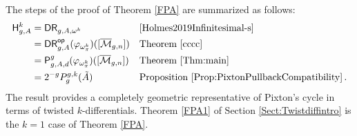 \documentclass[a4paper,12pt]{article} %
\def\P{\mathsf{P}}
\theoremstyle{definition}
\theoremstyle{plain}%
\renewcommand{\phi}{\varphi}
\newcommand{\jocomment}[1]{}
\begin{document}
The steps of the proof of Theorem \ref{FPA} are summarized as follows:
\begin{align*}
    \mathsf{H}^k_{g,A}&=\mathsf{DR}_{g,A, \omega^k} &&\cite[\text{Theorem }1.1]{Holmes2019Infinitesimal-s}\\
    &=\mathsf{DR}^{\mathsf{op}}_{g,A}(\phi_{\omega_\pi^k})([\overline{\mathcal{M}}_{g,n}]) &&\text{Theorem }\ref{cccc}\\
    &=\P_{g,A,d}^g(\phi_{\omega_\pi^k})([\overline{\mathcal{M}}_{g,n}]) &&\text{Theorem }\ref{Thm:main}\\
    &=2^{-g} P_g^{g,k}(\tilde A) &&\text{Proposition }\ref{Prop:PixtonPullbackCompatibility}\, . 
\end{align*}
The result provides a completely geometric representative
of Pixton's cycle in terms of twisted $k$-differentials. 
Theorem \ref{FPA1} of Section \ref{Sect:Twistdiffintro} is the $k=1$ case of 
Theorem \ref{FPA}.


\end{document}

